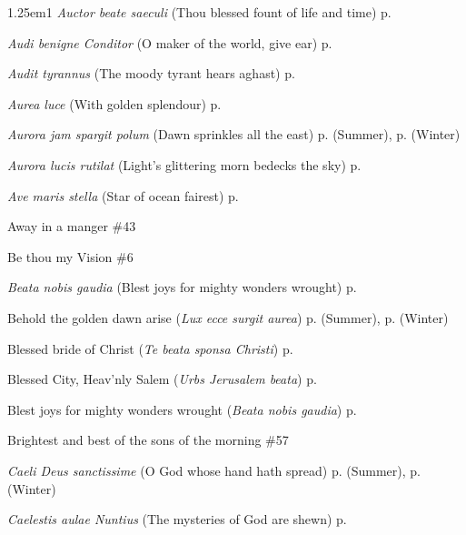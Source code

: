 \begin{hangparas}{1.25em}{1}
\textit{Auctor beate saeculi} (Thou blessed fount of life and time) \dotfill p. \pageref{CompassionEvensongHymn}
\par\noindent
\textit{Audi benigne Conditor} (O maker of the world, give ear) \dotfill p. \pageref{FirstLentEvensong}
\par\noindent
\textit{Audit tyrannus} (The moody tyrant hears aghast) \dotfill p. \pageref{HolyInnocentsInvitatoryHymn}
\par\noindent
\textit{Aurea luce} (With golden splendour) \dotfill p. \pageref{PeterEvensong}
\par\noindent
\textit{Aurora jam spargit polum} (Dawn sprinkles all the east) \dotfill p. \pageref{SaturdayMattinsSummer} (Summer), p. \pageref{SaturdayMattinsWinter} (Winter)
\par\noindent
\textit{Aurora lucis rutilat} (Light's glittering morn bedecks the sky) \dotfill p. \pageref{EasterDayMattins}
\par\noindent
\textit{Ave maris stella} (Star of ocean fairest) \dotfill p. \pageref{BVMEvensong}
\par\noindent
Away in a manger \dotfill \#43
\par\noindent
Be thou my Vision \dotfill \#6
\par\noindent
\textit{Beata nobis gaudia} (Blest joys for mighty wonders wrought) \dotfill p. \pageref{WhitsundayMattinsHymn}
\par\noindent
Behold the golden dawn arise (\textit{Lux ecce surgit aurea}) \dotfill p. \pageref{ThursdayMattinsSummer} (Summer), p. \pageref{ThursdayMattinsWinter} (Winter)
\par\noindent
Blessed bride of Christ (\textit{Te beata sponsa Christi}) \dotfill p. \pageref{ScholasticaEvensong}
\par\noindent
Blessed City, Heav'nly Salem (\textit{Urbs Jerusalem beata}) \dotfill p. \pageref{DedicationEvensong}
\par\noindent
Blest joys for mighty wonders wrought (\textit{Beata nobis gaudia}) \dotfill p. \pageref{WhitsundayMattinsHymn}
\par\noindent
Brightest and best of the sons of the morning \dotfill \#57
\par\noindent
\textit{Caeli Deus sanctissime} (O God whose hand hath spread) \dotfill p. \pageref{WednesdayEvensongSummer} (Summer), p. \pageref{WednesdayEvensongWinter} (Winter)
\par\noindent
\textit{Caelestis aulae Nuntius} (The mysteries of God are shewn) \dotfill p. \pageref{HolyRosaryIEvensong}

\end{hangparas}
